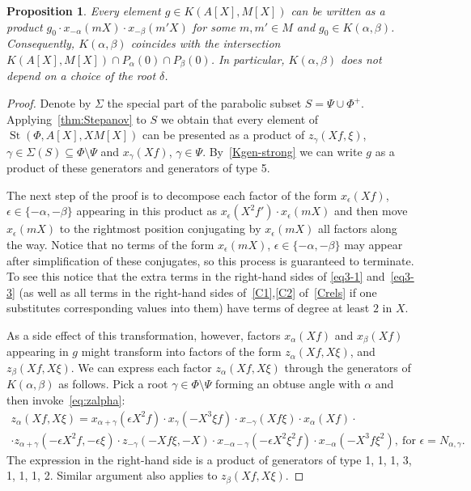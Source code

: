 \documentclass[oneside, 8pt]{amsart}
\newtheorem{prop}{Proposition}
\theoremstyle{remark}
\theoremstyle{definition}
\DeclareMathOperator{\St}{St}
\numberwithin{equation}{section}
\begin{document}
\begin{prop} \label{K-a-b} Every element $g \in K(A[X], M[X])$ can be written as a product $g_0 \cdot x_{-\alpha}(mX) \cdot x_{-\beta}(m'X)$ for some $m, m' \in M$ and $g_0 \in K(\alpha, \beta)$. 
Consequently, $K(\alpha, \beta)$ coincides with the intersection $K(A[X], M[X]) \cap P_\alpha(0) \cap P_\beta(0)$. 
In particular, $K(\alpha, \beta)$ does not depend on a choice of the root $\delta$. \end{prop}
\begin{proof} Denote by $\Sigma$ the special part of the parabolic subset $S = \Psi \cup \Phi^+$. Applying~\cref{thm:Stepanov} to $S$ we obtain that every element of $\St(\Phi, A[X], XM[X])$ can be presented as a product of $z_\gamma(Xf, \xi)$, $\gamma \in \Sigma(S) \subseteq \Phi\setminus \Psi$ and $x_\gamma(Xf)$, $\gamma \in \Psi$. By~\cref{Kgen-strong} we can write $g$ as a product of these generators and generators of type 5.
  
 The next step of the proof is to decompose each factor of the form $x_{\epsilon}(Xf)$, $\epsilon \in \{-\alpha,-\beta\}$ appearing in this product as
 $x_{\epsilon}(X^2f') \cdot x_{\epsilon}(mX)$ and then move $x_{\epsilon}(mX)$ to the rightmost position conjugating by $x_{\epsilon}(mX)$ all factors along the way.
 Notice that no terms of the form $x_{\epsilon}(mX)$, $\epsilon \in \{ -\alpha, -\beta \}$ may appear after simplification of these conjugates, so this process is guaranteed to terminate.
 To see this notice that the extra terms in the right-hand sides of \eqref{eq3-1} and~\eqref{eq3-3} 
 (as well as all terms in the right-hand sides of~\eqref{C1},\eqref{C2} of~\cref{Crels} if one substitutes corresponding values into them) have terms of degree at least $2$ in $X$. 
  
 As a side effect of this transformation, however, factors $x_\alpha(Xf)$ and $x_\beta(Xf)$ appearing in $g$ might transform into factors of the form $z_\alpha(Xf, X\xi)$, and $z_\beta(Xf, X\xi)$. We can express each factor $z_\alpha(Xf, X\xi)$ through the generators of $K(\alpha, \beta)$ as follows. Pick a root $\gamma \in \Phi\setminus \Psi$ forming an obtuse angle with $\alpha$ and then invoke~\eqref{eq:zalpha}:
 \begin{multline} z_\alpha(Xf, X\xi) = x_{\alpha+\gamma}(\epsilon X^2f) \cdot x_{\gamma}(-X^3 \xi f) \cdot x_{-\gamma}(Xf\xi) \cdot x_\alpha(Xf) \cdot \\ 
 \cdot z_{\alpha+\gamma}(-\epsilon X^2 f, -\epsilon \xi) \cdot z_{-\gamma}(-Xf\xi, -X) \cdot x_{-\alpha-\gamma}(-\epsilon X^2\xi^2 f) \cdot x_{-\alpha}(-X^3 f \xi^2),\ \text{for } \epsilon = N_{\alpha, \gamma}. \end{multline}
 The expression in the right-hand side is a product of generators of type 1, 1, 1, 3, 1, 1, 1, 2. Similar argument also applies to $z_\beta(Xf, X\xi)$.  
 

\end{proof}
\end{document}
